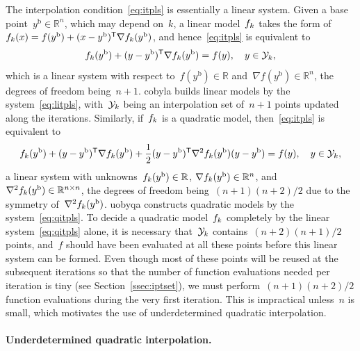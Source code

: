 \documentclass[
    smallextended,  %
    final,        %
]{svjour3}
\newcommand{\R}{\mathbb{R}}
\newcommand{\T}{\mathsf{T}}
\newcommand{\base}{{\text{b}}}
\newcommand{\objm}[1][k]{\obj\ifthenelse{\equal{#1}{}}{}{_{#1}}}
\newcommand{\obj}{f}
\newcommand{\xpt}[1][k]{\mathcal{Y}\ifthenelse{\equal{#1}{}}{}{_{#1}}}
\begin{document}
The interpolation condition~\eqref{eq:itpls} is essentially a linear system.
Given a base point~$y^{\base}\in \R^n$, which may depend on~$k$, a linear model~$\objm$ takes the
form of~$\objm(x) = \obj(y^{\base}) + (x - y^{\base})^{\T} \nabla \objm(y^{\base})$, and
hence~\eqref{eq:itpls} is equivalent to
\begin{equation}
    \label{eq:litpls}
    \objm(y^{\base}) + (y -y^{\base})^{\T} \nabla \objm(y^{\base})  = \obj(y),  \quad y \in \xpt,
\end{equation}
which is a linear system with respect to~$\obj(y^\base) \in \R$ and~$\nabla \obj(y^\base) \in \R^n$, the degrees of freedom being~$n+1$.
\Gls{cobyla} builds linear models by the system~\eqref{eq:litpls}, with~$\xpt$ being an interpolation
set of~$n+1$ points updated along the iterations.
Similarly, if~$\objm$ is a quadratic model, then~\eqref{eq:itpls} is equivalent to
\begin{equation}
    \label{eq:qitpls}
    \objm(y^{\base}) + (y -y^{\base})^{\T} \nabla \objm(y^{\base})
    + \frac{1}{2}(y-y^{\base})^{\T}  \nabla^2 \objm(y^{\base}) (y-y^{\base}) = \obj(y),  \quad y \in \xpt,
\end{equation}
a linear system with unknowns~$\objm(y^\base) \in \R$, $\nabla \objm(y^\base) \in \R^n$, and~$\nabla^2 \objm(y^{\base})\in\R^{n \times n}$, the degrees of freedom being~$(n + 1)(n + 2) / 2$ due to the symmetry of~$\nabla^2 \objm(y^\base)$.
\Gls{uobyqa} constructs quadratic models by the system~\eqref{eq:qitpls}.
To decide a quadratic model~$\objm$ completely by the linear system~\eqref{eq:qitpls} alone, it is necessary that~$\xpt$ contains~$(n+2)(n+1)/2$ points, and~$f$ should have been evaluated at all these points before this linear system can be formed.
Even though most of these points will be reused at the subsequent iterations so that the number of
function evaluations needed per iteration is tiny (see Section~\ref{ssec:iptset}), we must perform~$(n + 1)(n + 2) / 2$ function evaluations during the very first iteration.
This is impractical unless~$n$ is small, which motivates the use of underdetermined quadratic interpolation.

\paragraph{\textnormal{\textbf{Underdetermined quadratic interpolation.}}}
\end{document}
